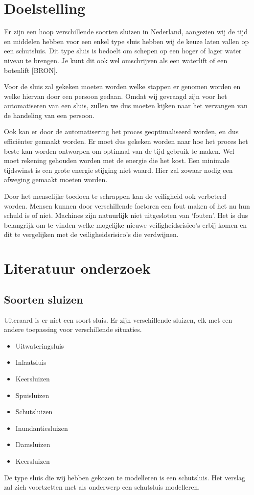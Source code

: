\documentclass{article}
\begin{document}
\clearpage %
\section{Doelstelling}
Er zijn een hoop verschillende soorten sluizen in Nederland, aangezien wij de tijd en middelen hebben voor een enkel type sluis hebben wij de keuze laten vallen op een schutsluis. Dit type sluis is bedoelt om schepen op een hoger of lager water niveau te brengen. Je kunt dit ook wel omschrijven als een waterlift of een botenlift [BRON].

Voor de sluis zal gekeken moeten worden welke stappen er genomen worden en welke hiervan door een persoon gedaan. Omdat wij gevraagd zijn voor het automatiseren van een sluis, zullen we dus moeten kijken naar het vervangen van de handeling van een persoon.

Ook kan er door de automatisering het proces geoptimaliseerd worden, en dus efficiënter gemaakt worden. Er moet dus gekeken worden naar hoe het proces het beste kan worden ontworpen om optimaal van de tijd gebruik te maken. Wel moet rekening gehouden worden met de energie die het kost. Een minimale tijdswinst is een grote energie stijging niet waard. Hier zal zowaar nodig een afweging gemaakt moeten worden.

Door het menselijke toedoen te schrappen kan de veiligheid ook verbeterd worden. Mensen kunnen door verschillende factoren een fout maken of het nu hun schuld is of niet. Machines zijn natuurlijk niet uitgesloten van ‘fouten’. Het is dus belangrijk om te vinden welke mogelijke nieuwe veiligheidsrisico’s erbij komen en dit te vergelijken met de veiligheidsrisico’s die verdwijnen.


\clearpage %
\section{Literatuur onderzoek} %

\subsection{Soorten sluizen}
Uiteraard is er niet een soort sluis. Er zijn verschillende sluizen, elk met een andere toepassing voor verschillende situaties.\cite{soortensluizen}
\begin{itemize}
\item Uitwateringsluis
\item Inlaatsluis
\item Keersluizen
\item Spuisluizen
\item Schutsluizen
\item Inundantiesluizen
\item Damsluizen
\item Keersluizen
\end{itemize}
De type sluis die wij hebben gekozen te modelleren is een schutsluis. Het verslag zal zich voortzetten met als onderwerp een schutsluis modelleren.
\end{document}
